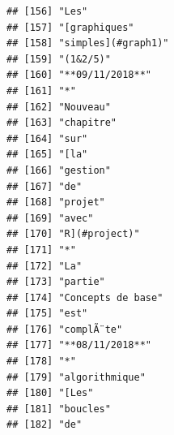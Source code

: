 \documentclass[]{book}
\begin{document}
\begin{verbatim}
## [156] "Les"                                                                                    
## [157] "[graphiques"                                                                            
## [158] "simples](#graph1)"                                                                      
## [159] "(1&2/5)"                                                                                
## [160] "**09/11/2018**"                                                                         
## [161] "*"                                                                                      
## [162] "Nouveau"                                                                                
## [163] "chapitre"                                                                               
## [164] "sur"                                                                                    
## [165] "[la"                                                                                    
## [166] "gestion"                                                                                
## [167] "de"                                                                                     
## [168] "projet"                                                                                 
## [169] "avec"                                                                                   
## [170] "R](#project)"                                                                           
## [171] "*"                                                                                      
## [172] "La"                                                                                     
## [173] "partie"                                                                                 
## [174] "Concepts de base"                                                                       
## [175] "est"                                                                                    
## [176] "complÃ¨te"                                                                              
## [177] "**08/11/2018**"                                                                         
## [178] "*"                                                                                      
## [179] "algorithmique"                                                                          
## [180] "[Les"                                                                                   
## [181] "boucles"                                                                                
## [182] "de"                                                                                     

\end{verbatim}
\end{document}
